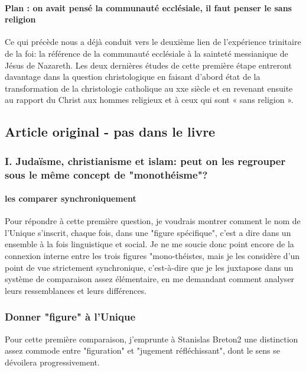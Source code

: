 \paragraph{Plan : on avait pensé la communauté ecclésiale, il faut penser le sans religion}
Ce qui précède nous a déjà conduit vers le deuxième lien de l'expérience trinitaire de la foi: la référence de la communauté ecclésiale à la sainteté messianique de Jésus de Nazareth.
Les deux dernières études de cette première étape entreront davantage dans la question christologique en faisant d'abord état de la transformation de la christologie catholique au xxe siècle et en revenant ensuite au rapport du Christ aux hommes religieux et à ceux qui sont « sans religion ».


\subsection{Article original - pas dans le livre}

\subsubsection{I. Judaïsme, christianisme et islam: peut on les regrouper sous le même concept de "monothéisme"?}

\paragraph{les comparer synchroniquement}
Pour répondre à cette première question, je voudrais montrer comment le nom de l'Unique s'inscrit, chaque fois, dans une "figure spécifique", c'est a dire dans un ensemble à la fois linguistique et social. Je ne me soucie donc point encore de la connexion interne entre les trois figures "mono-théistes, mais je les considère d'un point de vue strictement synchronique, c'est-à-dire que je les juxtapose dans un système de comparaison assez élémentaire, en me demandant comment analyser leurs ressemblances et leurs différences.

\subsubsection{Donner "figure" à l'Unique}

Pour cette première comparaison, j'emprunte à Stanislas Breton2 une distinction assez commode entre "figuration" et "jugement réfléchissant", dont le sens se dévoilera progressivement.

